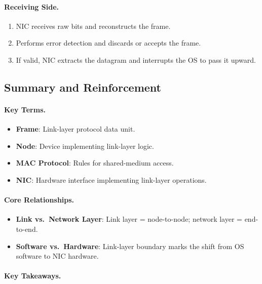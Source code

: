 \documentclass[12pt]{article}
\begin{document}
\paragraph{Receiving Side.}
\begin{enumerate}
    \item NIC receives raw bits and reconstructs the frame.
    \item Performs error detection and discards or accepts the frame.
    \item If valid, NIC extracts the datagram and interrupts the OS to pass it upward.
\end{enumerate}

\subsection{Summary and Reinforcement}

\paragraph{Key Terms.}

\begin{itemize}
    \item \textbf{Frame}: Link-layer protocol data unit.
    \item \textbf{Node}: Device implementing link-layer logic.
    \item \textbf{MAC Protocol}: Rules for shared-medium access.
    \item \textbf{NIC}: Hardware interface implementing link-layer operations.
\end{itemize}

\paragraph{Core Relationships.}

\begin{itemize}
    \item \textbf{Link vs.\ Network Layer}: Link layer = node-to-node; network layer = end-to-end.
    \item \textbf{Software vs.\ Hardware}: Link-layer boundary marks the shift from OS software to NIC hardware.
\end{itemize}

\paragraph{Key Takeaways.}
\end{document}
